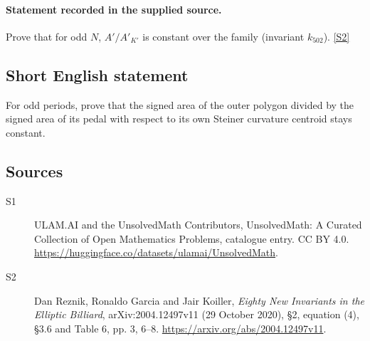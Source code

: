 \documentclass[11pt]{article}
\newcommand{\sref}[2]{\hyperlink{source:#1:#2}{[S#2]}}
\begin{document}
\paragraph{Statement recorded in the supplied source.}
Prove that for odd $N$, $A'/A'_{K'}$ is constant over the family (invariant $k_{502}$). \sref{statement}{2}
\subsection{Short English statement}
For odd periods, prove that the signed area of the outer polygon divided by the signed area of its pedal with respect to its own Steiner curvature centroid stays constant.
\subsection{Sources}
\begin{description}
\item[\hypertarget{source:statement:1}{S1}] ULAM.AI and the UnsolvedMath Contributors, UnsolvedMath: A Curated Collection of Open Mathematics Problems, catalogue entry. CC BY 4.0. \url{https://huggingface.co/datasets/ulamai/UnsolvedMath}.
\item[\hypertarget{source:statement:2}{S2}] Dan Reznik, Ronaldo Garcia and Jair Koiller, \emph{Eighty New Invariants in the Elliptic Billiard}, arXiv:2004.12497v11 (29 October 2020), \S2, equation (4), \S3.6 and Table 6, pp. 3, 6--8. \url{https://arxiv.org/abs/2004.12497v11}.
\end{description}
\label{end:statement}
\end{document}
